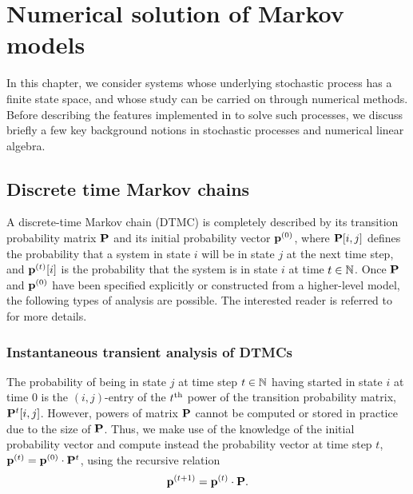 %
%

\chapter{Numerical solution of Markov models}  \label{SEC:Numerical}



In this chapter, we consider systems whose underlying
stochastic process has a finite state space, and whose study can be carried
on through numerical methods.
Before describing the features implemented in {\smart} to solve such processes,
we discuss briefly a few key background notions in stochastic processes and
numerical linear algebra.

\section{Discrete time Markov chains}
A discrete-time Markov chain (DTMC)
is completely described by its transition
probability matrix $\P$ and its initial probability vector $\vp^{(0)}$,
where $\P[i,j]$ defines the probability
that a system in state $i$ will be in state $j$ at the next time step, and
$\vp^{(t)}[i]$ is the probability that the system is in state
$i$ at time $t \in \Naturals$.
Once $\P$ and $\vp^{(0)}$ have been specified explicitly or constructed from a
higher-level model, the following types of analysis are possible.
The interested reader is referred to \cite{Ross2003book} for more details.

\subsection{Instantaneous transient analysis of DTMCs}\label{SEC:powerDTMC}
The probability of being in state $j$ at time step $t \in \Naturals$
having started in state $i$ at time $0$ is the $(i,j)$-entry of
the $t\SUPTH$ power of the transition probability matrix, $\P^t[i,j]$.
However, powers of matrix $\P$ cannot be computed or stored in practice
due to the size of $\P$.
Thus, we make use of the knowledge of the initial probability vector
and compute instead the probability vector at time step $t$,
$\vp^{(t)} = \vp^{(0)} \cdot \P^t$, using the recursive relation
\[
  \vp^{(t+1)} = \vp^{(t)} \cdot \P.
\]

